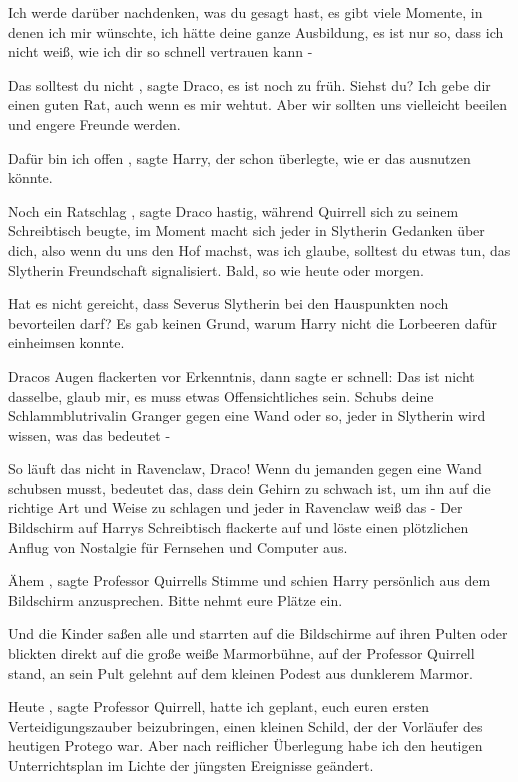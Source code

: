 \glqq Ich werde darüber nachdenken, was du gesagt hast, es gibt viele Momente,
in denen ich mir wünschte, ich hätte deine ganze Ausbildung, es ist nur so, dass
ich nicht weiß, wie ich dir so schnell vertrauen kann -\grqq{}

\glqq Das solltest du nicht\grqq{} , sagte Draco, \glqq es ist noch zu früh.
Siehst du? Ich gebe dir einen guten Rat, auch wenn es mir wehtut. Aber wir
sollten uns vielleicht beeilen und engere Freunde werden.\grqq{}

\glqq Dafür bin ich offen\grqq{} , sagte Harry, der schon überlegte, wie er das
ausnutzen könnte.

\glqq Noch ein Ratschlag\grqq{} , sagte Draco hastig, während Quirrell sich zu
seinem Schreibtisch beugte, \glqq im Moment macht sich jeder in Slytherin
Gedanken über dich, also wenn du uns den Hof machst, was ich glaube, solltest du
etwas tun, das Slytherin Freundschaft signalisiert. Bald, so wie heute oder
morgen.\grqq{}

\glqq Hat es nicht gereicht, dass Severus Slytherin bei den Hauspunkten noch
bevorteilen darf?\grqq{} Es gab keinen Grund, warum Harry nicht die Lorbeeren
dafür einheimsen konnte.

Dracos Augen flackerten vor Erkenntnis, dann sagte er schnell: \glqq Das ist
nicht dasselbe, glaub mir, es muss etwas Offensichtliches sein. Schubs deine
Schlammblutrivalin Granger gegen eine Wand oder so, jeder in Slytherin wird
wissen, was das bedeutet -\grqq{}

\glqq So läuft das nicht in Ravenclaw, Draco! Wenn du jemanden gegen eine Wand
schubsen musst, bedeutet das, dass dein Gehirn zu schwach ist, um ihn auf die
richtige Art und Weise zu schlagen und jeder in Ravenclaw weiß das -\grqq{} Der
Bildschirm auf Harrys Schreibtisch flackerte auf und löste einen plötzlichen
Anflug von Nostalgie für Fernsehen und Computer aus.

\glqq Ähem\grqq{} , sagte Professor Quirrells Stimme und schien Harry persönlich
aus dem Bildschirm anzusprechen. \glqq Bitte nehmt eure Plätze ein.\grqq{}

Und die Kinder saßen alle und starrten auf die Bildschirme auf ihren Pulten oder
blickten direkt auf die große weiße Marmorbühne, auf der Professor Quirrell
stand, an sein Pult gelehnt auf dem kleinen Podest aus dunklerem Marmor.

\glqq Heute\grqq{} , sagte Professor Quirrell, \glqq hatte ich geplant, euch
euren ersten Verteidigungszauber beizubringen, einen kleinen Schild, der der
Vorläufer des heutigen Protego war. Aber nach reiflicher Überlegung habe ich den
heutigen Unterrichtsplan im Lichte der jüngsten Ereignisse geändert.\grqq{}

